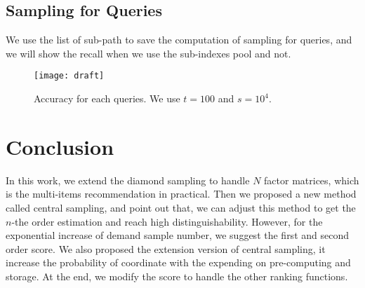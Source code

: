 \documentclass[letterpaper]{article}
\begin{document}
\subsection{Sampling for Queries}
We use the list of sub-path to save the computation of sampling for queries, and we will show the recall when we use the sub-indexes pool and not.
\begin{figure}[ht]
  \centering
  \texttt{[image: draft]}\\
  \caption{Accuracy for each queries. We use $t=100$ and $s=10^4$.}
  \label{fig:Queries}
\end{figure}

\section{Conclusion}

In this work, we extend the diamond sampling to handle $N$ factor matrices, which is the multi-items recommendation in practical. Then we proposed a new method called central sampling, and point out that, we can adjust this method to get the $n$-the order estimation and reach high distinguishability. However, for the exponential increase of demand sample number, we suggest the first and second order score. We also proposed the extension version of central sampling, it increase the probability of coordinate with the expending on pre-computing and storage. At the end, we modify the score to handle the other ranking functions.



\end{document}
